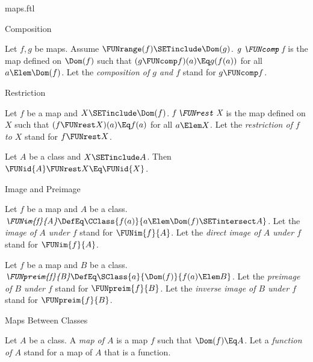 \documentclass{stex}
\begin{document}
\begin{smodule}{maps.ftl}
\begin{sfragment}{Composition}
  \begin{definition}[forthel,for=composition]
    Let $f, g$ be maps.
    Assume $\FUNrange(f) \SETinclude \Dom(g)$.
    $\emph{g \FUNcomp f}$ is the map defined on $\Dom(f)$ such that $(g \FUNcomp f)(a) \Eq g(f(a))$ for all $a \Elem \Dom(f)$.
    Let the \emph{composition of $g$ and $f$} stand for $g \FUNcomp f$.
  \end{definition}
\end{sfragment}

\begin{sfragment}{Restriction}
  \begin{definition}[forthel,for=restriction]
    Let $f$ be a map and $X \SETinclude \Dom(f)$.
    $\emph{f \FUNrest X}$ is the map defined on $X$ such that $(f \FUNrest X)(a) \Eq f(a)$ for all $a \Elem X$.
    Let the \emph{restriction of $f$ to $X$} stand for $f \FUNrest X$.
  \end{definition}

  \begin{proposition}[forthel]
    Let $A$ be a class and $X \SETinclude A$.
    Then $\FUNid{A} \FUNrest X \Eq \FUNid{X}$.
  \end{proposition}
\end{sfragment}

\begin{sfragment}{Image and Preimage}
  \begin{definition}[forthel,for={FUNim,image,direct image}]
    Let $f$ be a map and $A$ be a class.
    $\emph{\FUNim{f}{A}} \DefEq \CClass{f(a)}{a \Elem \Dom(f) \SETintersect A}$.
    Let the \emph{image of $A$ under $f$} stand for $\FUNim{f}{A}$.
    Let the \emph{direct image of $A$ under $f$} stand for $\FUNim{f}{A}$.
  \end{definition}

  \begin{definition}[forthel,for={preimage,inverse image}]
    Let $f$ be a map and $B$ be a class.
    $\emph{\FUNpreim{f}{B}} \DefEq \SClass{a}{\Dom(f)}{f(a) \Elem B}$.
    Let the \emph{preimage of $B$ under $f$} stand for $\FUNpreim{f}{B}$.
    Let the \emph{inverse image of $B$ under $f$} stand for $\FUNpreim{f}{B}$.
  \end{definition}
\end{sfragment}

\begin{sfragment}{Maps Between Classes}
  \begin{definition}[forthel,for={map,function}]
    Let $A$ be a class.
    A \emph{map of $A$} is a map $f$ such that $\Dom(f) \Eq A$.
    Let a \emph{function of $A$} stand for a map of $A$ that is a function.
  \end{definition}


\end{sfragment}
\end{smodule}
\end{document}
